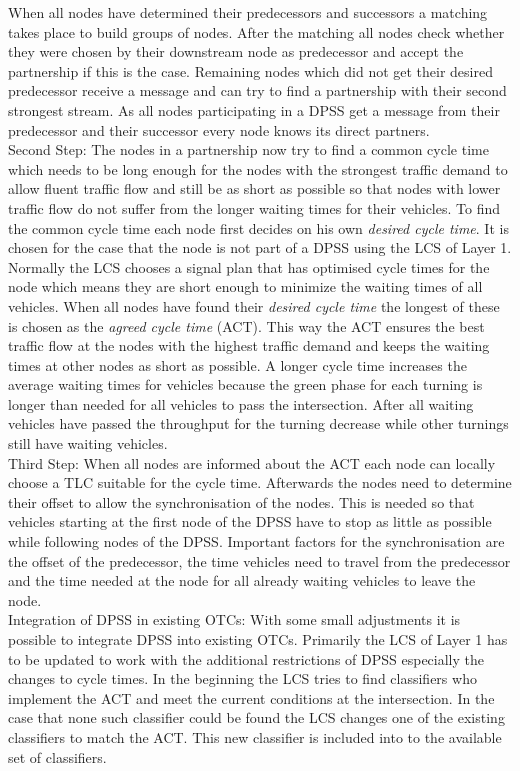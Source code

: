 When all nodes have determined their predecessors and successors a matching takes place to build groups of nodes. After the matching all nodes check whether they were chosen by their downstream node as predecessor and accept the partnership if this is the case. Remaining nodes which did not get their desired predecessor receive a message and can try to find a partnership with their second strongest stream. As all nodes participating in a DPSS get a message from their predecessor and their successor every node knows its direct partners.\cite{organic1}\ \\
Second Step: The nodes in a partnership now try to find a common cycle time which needs to be long enough for the nodes with the strongest traffic demand to allow fluent traffic flow and still be as short as possible so that nodes with lower traffic flow do not suffer from the longer waiting times for their vehicles.
To find the common cycle time each node first decides on his own \textit{desired cycle time}. It is chosen for the case that the node is not part of a DPSS using the LCS of Layer 1. Normally the LCS chooses a signal plan that has optimised cycle times for the node which means they are short enough to minimize the waiting times of all vehicles.
When all nodes have found their \textit{desired cycle time} the longest of these is chosen as the \textit{agreed cycle time} (ACT). This way the ACT ensures the best traffic flow at the nodes with the highest traffic demand and keeps the waiting times at other nodes as short as possible. A longer cycle time increases the average waiting times for vehicles because the green phase for each turning is longer than needed for all vehicles to pass the intersection. After all waiting vehicles have passed the throughput for the turning decrease while other turnings still have waiting vehicles. \cite{organic1}\ \\
Third Step: When all nodes are informed about the ACT each node can locally choose a TLC suitable for the cycle time. Afterwards the nodes need to determine their offset to allow the synchronisation of the nodes. This is needed so that vehicles starting at the first node of the DPSS have to stop as little as possible while following nodes of the DPSS. Important factors for the synchronisation are the offset of the predecessor, the time vehicles need to travel from the predecessor and the time needed at the node for all already waiting vehicles to leave the node.\cite{organic1}\ \\

Integration of DPSS in existing OTCs: With some small adjustments it is possible to integrate DPSS into existing OTCs. Primarily the LCS of Layer 1 has to be updated to work with the additional restrictions of DPSS especially the changes to cycle times. In the beginning the LCS tries to find classifiers who implement the ACT and meet the current conditions at the intersection. In the case that none such classifier could be found the LCS changes one of the existing classifiers to match the ACT. This new classifier is included into to the available set of classifiers.\cite{organic1}\ \\

